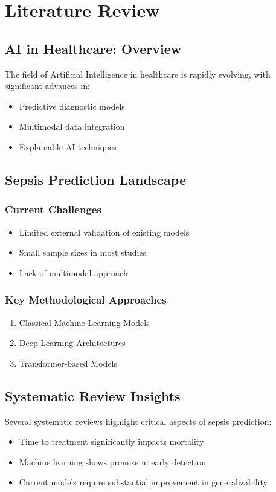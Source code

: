 \chapter{Literature Review}
\section{AI in Healthcare: Overview}
The field of Artificial Intelligence in healthcare is rapidly evolving, with significant advances in:
\begin{itemize}
    \item Predictive diagnostic models \cite{optimizing_ai_sepsis_2024}
    \item Multimodal data integration
    \item Explainable AI techniques
\end{itemize}

\section{Sepsis Prediction Landscape}
\subsection{Current Challenges}
\begin{itemize}
    \item Limited external validation of existing models
    \item Small sample sizes in most studies
    \item Lack of multimodal approach
\end{itemize}

\subsection{Key Methodological Approaches}
\begin{enumerate}
    \item Classical Machine Learning Models
    \item Deep Learning Architectures
    \item Transformer-based Models
\end{enumerate}

\section{Systematic Review Insights}
Several systematic reviews highlight critical aspects of sepsis prediction:
\begin{itemize}
    \item Time to treatment significantly impacts mortality
    \item Machine learning shows promise in early detection
    \item Current models require substantial improvement in generalizability
\end{itemize}

